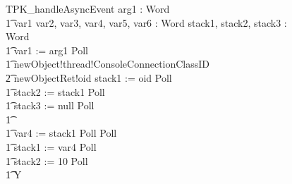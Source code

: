 \begin{figure}[tp!]
  \centering
  \setlength{\zedtab}{0.5cm}
  \setlength{\zedindent}{0pt}
  \setlength{\zedleftsep}{0pt}
  \setlength{\abovedisplayskip}{0pt}
  \setlength{\belowdisplayskip}{0pt}
  \setlength{\abovedisplayshortskip}{0pt}
  \setlength{\belowdisplayshortskip}{0pt}
  \begin{circusaction}
    TPK\_handleAsyncEvent \circdef \circval arg1 : Word \circspot \\
    \t1 \circvar var1 var2, var3, var4, var5, var6 : Word \circspot \circvar stack1, stack2, stack3 : Word \circspot \\
    \t1 var1 := arg1 \circseq Poll \circseq \\
    \t1 newObject!thread!ConsoleConnectionClassID \\
    \t2 {} \then  newObjectRet!oid \then stack1 := oid \circseq Poll \circseq \\
    \t1 stack2 := stack1 \circseq Poll \circseq \\
    \t1 stack3 := null \circseq Poll \circseq \\
    \t1 {} \cdots {} \\
    \t1 var4 := stack1 \circseq Poll \circseq Poll \circseq \\
    \t1 stack1 := var4 \circseq Poll \circseq \\
    \t1 stack2 := 10 \circseq Poll \circseq \\
    \t1 \circmu Y \circspot \\

\end{circusaction}
\end{figure}
